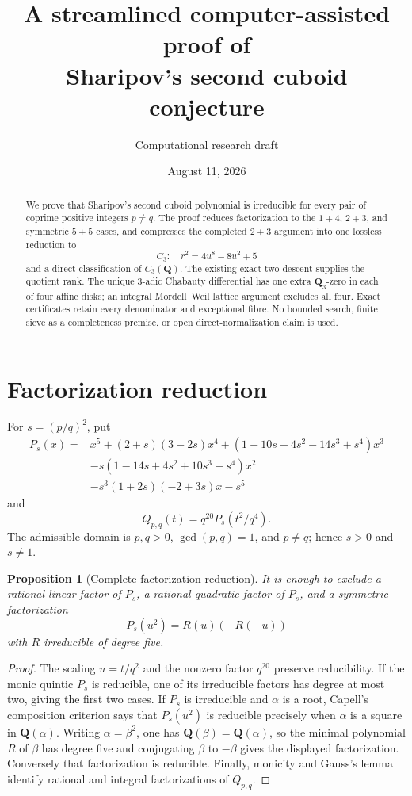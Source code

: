 \documentclass[11pt]{article}
\title{A streamlined computer-assisted proof of\\
Sharipov's second cuboid conjecture}
\author{Computational research draft}
\date{August 11, 2026}
\newtheorem{proposition}[theorem]{Proposition}
\newcommand{\Q}{\mathbf Q}
\begin{document}
\maketitle

\begin{abstract}
We prove that Sharipov's second cuboid polynomial is irreducible for every
pair of coprime positive integers $p\ne q$.  The proof reduces factorization
to the $1+4$, $2+3$, and symmetric $5+5$ cases, and compresses the completed
$2+3$ argument into one lossless reduction to
\[
 C_3:\quad r^2=4u^8-8u^2+5
\]
and a direct classification of $C_3(\Q)$.  The existing exact two-descent
supplies the quotient rank.  The unique $3$-adic Chabauty differential has one extra
$\Q_3$-zero in each of four affine disks; an integral Mordell--Weil lattice
argument excludes all four.  Exact certificates retain every denominator
and exceptional fibre.  No bounded search, finite sieve as a completeness
premise, or open direct-normalization claim is used.
\end{abstract}

\section{Factorization reduction}

For $s=(p/q)^2$, put
\[
\begin{aligned}
P_s(x)={}&x^5+(2+s)(3-2s)x^4
 +(1+10s+4s^2-14s^3+s^4)x^3\\
&-s(1-14s+4s^2+10s^3+s^4)x^2\\
&-s^3(1+2s)(-2+3s)x-s^5
\end{aligned}
\]
and
\[
 Q_{p,q}(t)=q^{20}P_s(t^2/q^4).
\]
The admissible domain is $p,q>0$, $\gcd(p,q)=1$, and $p\ne q$; hence
$s>0$ and $s\ne1$.

\begin{proposition}[Complete factorization reduction]\label{prop:factor}
It is enough to exclude a rational linear factor of $P_s$, a rational
quadratic factor of $P_s$, and a symmetric factorization
\[
 P_s(u^2)=R(u)(-R(-u))
\]
with $R$ irreducible of degree five.
\end{proposition}

\begin{proof}
The scaling $u=t/q^2$ and the nonzero factor $q^{20}$ preserve
reducibility.  If the monic quintic $P_s$ is reducible, one of its
irreducible factors has degree at most two, giving the first two cases.
If $P_s$ is irreducible and $\alpha$ is a root, Capell's composition
criterion says that $P_s(u^2)$ is reducible precisely when $\alpha$ is a
square in $\Q(\alpha)$.  Writing $\alpha=\beta^2$, one has
$\Q(\beta)=\Q(\alpha)$, so the minimal polynomial $R$ of $\beta$ has degree
five and conjugating $\beta$ to $-\beta$ gives the displayed factorization.
Conversely that factorization is reducible.  Finally, monicity and Gauss's
lemma identify rational and integral factorizations of $Q_{p,q}$.
\end{proof}
\end{document}
